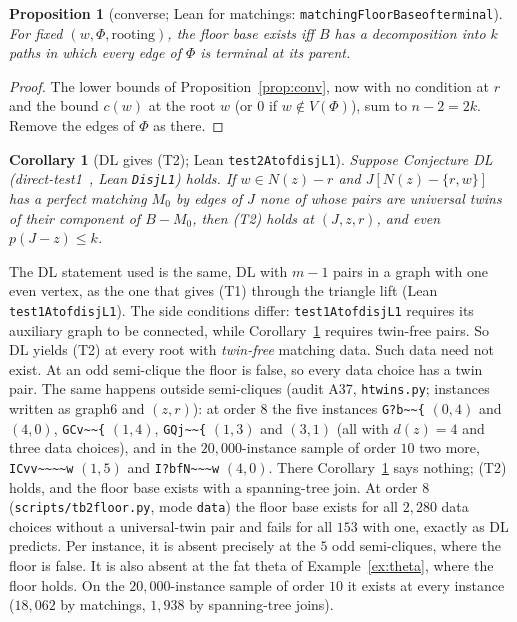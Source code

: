 \documentclass[11pt]{amsart}
\newtheorem{proposition}[theorem]{Proposition}
\newtheorem{corollary}[theorem]{Corollary}
\theoremstyle{definition}
\theoremstyle{remark}
\renewcommand{\_}{\oldunderscore\allowbreak}
\begin{document}
\begin{proposition}[converse; Lean for matchings: \texttt{matchingFloorBase\_of\_terminal}]\label{prop:floorconv}
For fixed $(w,\Phi,\text{rooting})$, the floor base exists iff $B$ has a decomposition into $k$ paths
in which every edge of $\Phi$ is terminal at its parent.
\end{proposition}

\begin{proof}
The lower bounds of Proposition~\ref{prop:conv}, now with no condition at $r$ and the bound $c(w)$
at the root $w$ (or $0$ if $w\notin V(\Phi)$), sum to $n-2=2k$. Remove the edges of $\Phi$ as there.
\end{proof}

\begin{corollary}[DL gives (T2); Lean \texttt{test2At\_of\_disjL1}]\label{cor:dl}
Suppose Conjecture DL (direct-test1~\cite{DT1}, Lean \texttt{DisjL1}) holds. If $w\in N(z)-r$ and $J[N(z)-\{r,w\}]$
has a perfect matching $M_0$ by edges of $J$ none of whose pairs are universal twins of their
component of $B-M_0$, then (T2) holds at $(J,z,r)$, and even $p(J-z)\le k$.
\end{corollary}

The DL statement used is the same, DL with $m-1$ pairs in a graph with one even vertex, as the
one that gives (T1) through the triangle lift (Lean \texttt{test1At\_of\_disjL1}). The side
conditions differ: \texttt{test1At\_of\_disjL1} requires its auxiliary graph to be connected, while
Corollary~\ref{cor:dl} requires twin-free pairs. So DL yields (T2) at every root with
\emph{twin-free} matching data. Such data need not exist. At an odd semi-clique the floor is false,
so every data choice has a twin pair. The same happens outside semi-cliques (audit A37,
\texttt{h\_twins.py}; instances written as graph6 and $(z,r)$): at order $8$ the five instances \texttt{G?b\textasciitilde\textasciitilde\{} $(0,4)$
and $(4,0)$, \texttt{GCv\textasciitilde\textasciitilde\{} $(1,4)$, \texttt{GQj\textasciitilde\textasciitilde\{}
$(1,3)$ and $(3,1)$ (all with $d(z)=4$ and three data choices), and in the $20{,}000$-instance sample
of order $10$ two more, \texttt{ICvv\textasciitilde\textasciitilde\textasciitilde\textasciitilde w} $(1,5)$ and
\texttt{I?bfN\textasciitilde\textasciitilde\textasciitilde w} $(4,0)$. There Corollary~\ref{cor:dl} says
nothing; (T2) holds, and the floor base exists with a spanning-tree join. At order $8$ (\texttt{scripts/tb2\_floor.py},
mode \texttt{data}) the floor base exists for all $2{,}280$ data choices without a universal-twin pair
and fails for all $153$ with one, exactly as DL predicts. Per instance, it is absent precisely at the
$5$ odd semi-cliques, where the floor is false. It is also absent at the fat theta of
Example~\ref{ex:theta}, where the floor holds. On the $20{,}000$-instance sample of order $10$ it exists
at every instance ($18{,}062$ by matchings, $1{,}938$ by spanning-tree joins).
\end{document}
